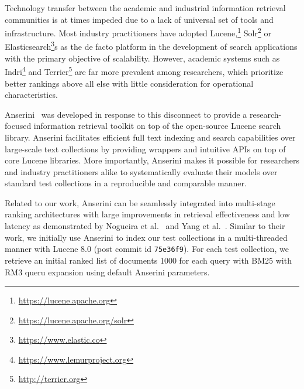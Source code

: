 Technology transfer between the academic and industrial information retrieval communities is at times impeded due to a lack of universal set of tools and infrastructure.
Most industry practitioners have adopted Lucene,\footnote{\url{https://lucene.apache.org}} Solr\footnote{\url{https://lucene.apache.org/solr}} or Elasticsearch\footnote{\url{https://www.elastic.co}}s as the de facto platform in the development of search applications with the primary objective of scalability.
However, academic systems such as Indri\footnote{\url{https://www.lemurproject.org}} and Terrier\footnote{\url{http://terrier.org}} are far more prevalent among researchers, which prioritize better rankings above all else with little consideration for operational characteristics.

Anserini~\cite{Yang_etal_SIGIR2017} was developed in response to this disconnect to provide a research-focused information retrieval toolkit on top of the open-source Lucene search library.
Anserini facilitates efficient full text indexing and search capabilities over large-scale text collections by providing wrappers and intuitive APIs on top of core Lucene libraries.
More importantly, Anserini makes it possible for researchers and industry practitioners alike to systematically evaluate their models over standard test collections in a reproducible and comparable manner.

Related to our work, Anserini can be seamlessly integrated into multi-stage ranking architectures with large improvements in retrieval effectiveness and low latency as demonstrated by Nogueira et al.~\cite{nogueira2019passage} and Yang et al.~\cite{yang2019end}.
Similar to their work, we initially use Anserini to index our test collections in a multi-threaded manner with Lucene 8.0 (post commit id \texttt{75e36f9}).
For each test collection, we retrieve an initial ranked list of documents 1000 for each query with BM25 with RM3 queru expansion using default Anserini parameters.


